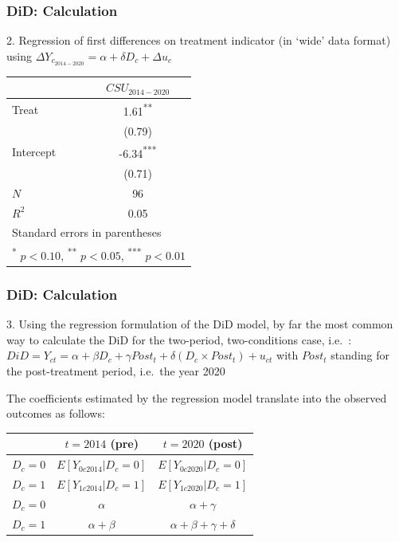 \documentclass[12pt,english,dvipsnames,aspectratio=169,handout]{beamer}\usepackage[]{graphicx}\usepackage[]{xcolor}
\begin{document}
\begin{frame}
  \frametitle{DiD: Calculation}
\footnotesize

2. Regression of first differences on treatment indicator (in `wide' data format) using $\Delta Y_{c_{2014-2020}} = \alpha + \delta D_c + \Delta u_c$ 
\vspace{5mm}

\scriptsize
\centering
\begin{tabular}{l*{1}{c}}
\toprule
          &\multicolumn{1}{c}{$CSU_{2014-2020}$}\\
\midrule
Treat &     1.61\textsuperscript{**} \\
          &   (0.79)         \\
Intercept   &    -6.34\textsuperscript{***}\\
          &   (0.71)         \\
\midrule
\(N\)     &       96         \\
\(R^{2}\) &     0.05         \\
\bottomrule
\multicolumn{2}{l}{ Standard errors in parentheses}\\
\multicolumn{2}{l}{ \textsuperscript{*} \(p<0.10\), \textsuperscript{**} \(p<0.05\), \textsuperscript{***} \(p<0.01\)}\\
\end{tabular}
\end{frame}




\begin{frame}
  \frametitle{DiD: Calculation}
\footnotesize

3. Using the regression formulation of the DiD model, by far the most common way to calculate the DiD for the two-period, two-conditions case, i.e.\ : $DiD = Y_{ct} = \alpha + \beta D_c + \gamma Post_t + \delta (D_c\times Post_t) + u_{ct}$ \scriptsize with $Post_t$ standing for the post-treatment period, i.e.\ the year 2020 \footnotesize

The coefficients estimated by the regression model translate into the observed outcomes as follows:

\scriptsize
\begin{table}\centering
\begin{tabular}{lcc}
\toprule
            &   $t=2014$ (pre)      & $t=2020$ (post) \\
\midrule
$D_c=0$     & $E[Y_{0c2014}|D_c=0]$           & $E[Y_{0c2020}|D_c=0]$ \\
$D_c=1$    & $E[Y_{1c2014}|D_c=1]$            & $E[Y_{1c2020}|D_c=1]$ \\
\midrule
$D_c=0$     & $\alpha$           & $\alpha + \gamma$ \\
$D_c=1$    & $\alpha + \beta$   & $\alpha + \beta + \gamma + \delta$ \\
\bottomrule
\end{tabular}
\end{table}

\end{frame}
\end{document}
